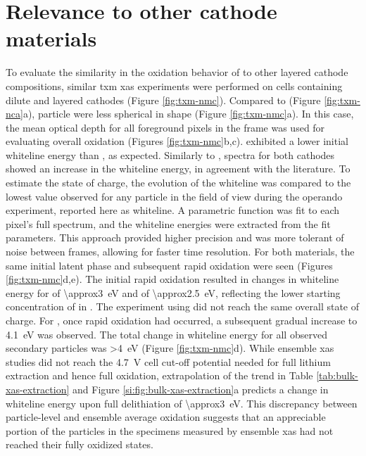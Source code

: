 \documentclass{article}
\begin{document}
\section{Relevance to other cathode materials}


To evaluate the similarity in the oxidation behavior of \nca{} to
other layered cathode compositions, similar \gls{txm} \gls{xas}
experiments were performed on cells containing dilute \nmc[333]{} and
\nmc[532]{} layered cathodes (Figure \ref{fig:txm-nmc}). Compared to
\nca{} (Figure \ref{fig:txm-nca}a), \nmc{} particle were less
spherical in shape (Figure \ref{fig:txm-nmc}a). In this case, the mean optical depth
for all foreground pixels in the frame was used for evaluating overall
oxidation (Figures \ref{fig:txm-nmc}b,c). \nmc[333]{} exhibited a lower initial whiteline energy than \nca{}, as expected\cite{deb2005,muto2009}. Similarly to \nca{}, spectra
for both \nmc{} cathodes showed an increase in the whiteline
energy, in agreement with the literature. To estimate the state of charge, the evolution of the whiteline was compared to the lowest value observed for any
particle in the field of view during the operando experiment, reported
here as \textDelta{}whiteline. A parametric function was fit to each
pixel's full spectrum, and the whiteline energies were extracted from
the fit parameters. This approach provided higher precision and was
more tolerant of noise between frames, allowing for faster time
resolution. For both \nmc{} materials, the same initial latent phase
and subsequent rapid oxidation were seen (Figures
\ref{fig:txm-nmc}d,e). The initial rapid  oxidation resulted in
changes in whiteline energy for \nmc[333]{} of
\SI{\approx3}{\electronvolt} and \nmc[532]{} of
\SI{\approx2.5}{\electronvolt}, reflecting the lower starting
concentration of  in \nmc[532]{}. The experiment using
\nmc[532]{} did not reach the same overall state of charge. For
\nmc[333]{}, once rapid oxidation had occurred, a subsequent gradual
increase to \SI{4.1}{eV} was observed. The total
change in whiteline energy for all observed secondary particles was
\SI{>4}{eV} (Figure \ref{fig:txm-nmc}d). While ensemble \gls{xas}
studies\cite{deb2005,muto2009} did not reach the \SI{4.7}{V} cell
cut-off potential needed for full lithium extraction and hence full
 oxidation, extrapolation of the trend in Table
\ref{tab:bulk-xas-extraction} and Figure
\ref{si:fig:bulk-xas-extraction}a predicts a change in whiteline energy
upon full delithiation of \SI{\approx3}{eV}. This discrepancy between
particle-level and ensemble average  oxidation suggests that an
appreciable portion of the particles in the specimens measured by
ensemble \gls{xas} had not reached their fully oxidized states.
\end{document}
